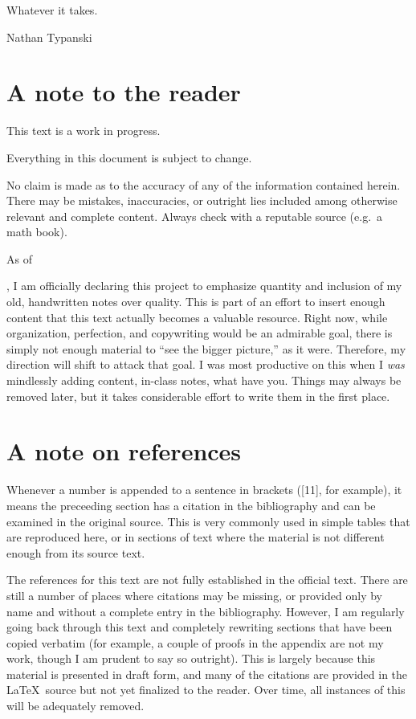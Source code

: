 Whatever it takes.

\hfill{Nathan Typanski}

\hfill \date{April 9, 2012}
\newpage
\section*{A note to the reader}
This text is a work in progress.

Everything in this document is subject to change.

No claim is made as to the accuracy of any of the information contained herein. There may be mistakes, inaccuracies, or outright lies included among otherwise relevant and complete content. Always check with a reputable source (e.g.\ a math book).

As of \date{July 14, 2013}, I am officially declaring this project to emphasize quantity and inclusion of my old, handwritten notes over quality.
This is part of an effort to insert enough content that this text actually becomes a valuable resource.
Right now, while organization, perfection, and copywriting would be an admirable goal, there is simply not enough material to ``see the bigger picture,'' as it were.
Therefore, my direction will shift to attack that goal.
I was most productive on this when I \emph{was} mindlessly adding content, in-class notes, what have you.
Things may always be removed later, but it takes considerable effort to write them in the first place.
\newpage
\section*{A note on references}
Whenever a number is appended to a sentence in brackets ([11], for example), it means the preceeding section has a citation in the bibliography and can be examined in the original source.
This is very commonly used in simple tables that are reproduced here, or in sections of text where the material is not different enough from its source text.

The references for this text are not fully established in the official text.
There are still a number of places where citations may be missing, or provided only by name and without a complete entry in the bibliography.
However, I am regularly going back through this text and completely rewriting sections that have been copied verbatim (for example, a couple of proofs in the appendix are not my work, though I am prudent to say so outright).
This is largely because this material is presented in draft form, and many of the citations are provided in the \LaTeX\ source but not yet finalized to the reader.
Over time, all instances of this will be adequately removed.
